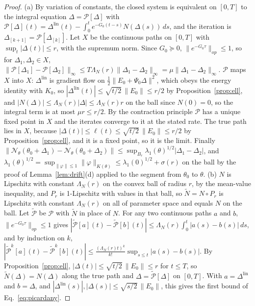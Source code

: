 \documentclass[11pt]{article}
\theoremstyle{definition}
\theoremstyle{remark}
\newcommand{\Net}{\mathcal{N}_\theta}    %
\begin{document}
\begin{proof}
(a) By variation of constants, the closed system is equivalent on $[0,T]$ to the integral equation $\Delta = \mathcal{P}[\Delta]$ with $\mathcal{P}[\Delta](t) = \Delta^{\mathrm{lin}}(t) - \int_0^te^{-G_0(t-s)}N(\Delta(s))\,ds$, and the iteration is $\Delta_{[k+1]} = \mathcal{P}[\Delta_{[k]}]$.
Let $X$ be the continuous paths on $[0,T]$ with $\sup_t|\Delta(t)|\le r$, with the supremum norm.
Since $G_0\succeq0$, $\|e^{-G_0\tau}\|_{op}\le1$, so for $\Delta_1,\Delta_2\in X$, $\|\mathcal{P}[\Delta_1] - \mathcal{P}[\Delta_2]\|_\infty\le T\Lambda_N(r)\|\Delta_1 - \Delta_2\|_\infty = \mu\|\Delta_1 - \Delta_2\|_\infty$.
$\mathcal{P}$ maps $X$ into $X$: $\Delta^{\mathrm{lin}}$ is gradient flow on $\frac12\|E_0 + \Psi_0\Delta\|^2$, which obeys the energy identity with $K_0$, so $|\Delta^{\mathrm{lin}}(t)|\le\sqrt{t/2}\,\|E_0\|\le r/2$ by Proposition~\ref{prop:ell}, and $|N(\Delta)|\le\Lambda_N(r)|\Delta|\le\Lambda_N(r)r$ on the ball since $N(0) = 0$, so the integral term is at most $\mu r\le r/2$.
By the contraction principle $\mathcal{P}$ has a unique fixed point in $X$ and the iterates converge to it at the stated rate.
The true path lies in $X$, because $|\Delta(t)|\le\ell(t)\le\sqrt{t/2}\,\|E_0\|\le r/2$ by Proposition~\ref{prop:ell}, and it is a fixed point, so it is the limit.
Finally $\|\Net(\theta_0 + \Delta_1) - \Net(\theta_0 + \Delta_2)\|\le\sup_{B_r}\lambda_1(\theta)^{1/2}|\Delta_1 - \Delta_2|$, and $\lambda_1(\theta)^{1/2} = \sup_{\|\varphi\|\le1}\|\varphi\|_{K(\theta)}\le\lambda_1(0)^{1/2} + \sigma(r)$ on the ball by the proof of Lemma~\ref{lem:drift}(d) applied to the segment from $\theta_0$ to $\theta$.
(b) $N$ is Lipschitz with constant $\Lambda_N(r)$ on the convex ball of radius $r$, by the mean-value inequality, and $P_r$ is 1-Lipschitz with values in that ball, so $\tilde N = N\circ P_r$ is Lipschitz with constant $\Lambda_N(r)$ on all of parameter space and equals $N$ on the ball.
Let $\tilde{\mathcal{P}}$ be $\mathcal{P}$ with $\tilde N$ in place of $N$.
For any two continuous paths $a$ and $b$, $\|e^{-G_0\tau}\|_{op}\le1$ gives $|\tilde{\mathcal{P}}[a](t) - \tilde{\mathcal{P}}[b](t)|\le\Lambda_N(r)\int_0^t|a(s) - b(s)|\,ds$, and by induction on $k$, $|\tilde{\mathcal{P}}^k[a](t) - \tilde{\mathcal{P}}^k[b](t)|\le\frac{(\Lambda_N(r)t)^k}{k!}\sup_{s\le t}|a(s) - b(s)|$.
By Proposition~\ref{prop:ell}, $|\Delta(t)|\le\sqrt{t/2}\,\|E_0\|\le r$ for $t\le T$, so $\tilde N(\Delta) = N(\Delta)$ along the true path and $\Delta = \tilde{\mathcal{P}}[\Delta]$ on $[0,T]$.
With $a = \Delta^{\mathrm{lin}}$ and $b = \Delta$, and $|\Delta^{\mathrm{lin}}(s)|, |\Delta(s)|\le\sqrt{s/2}\,\|E_0\|$, this gives the first bound of Eq.~\eqref{eq:picardany}.

\end{proof}
\end{document}
